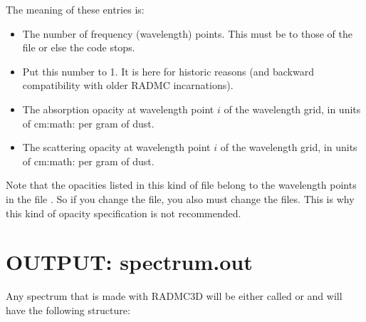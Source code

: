 \documentclass[letterpaper,10pt,english]{sphinxmanual}
\begin{document}
\begin{sphinxVerbatim}[commandchars=\\\{\}]
   
\PYG{p}{[}\PYG{p}{]}
\PYG{p}{[}\PYG{p}{]}
\PYG{p}{[}\PYG{p}{]}
\PYG{p}{[}\PYG{p}{]}
\end{sphinxVerbatim}

The meaning of these entries is:
\begin{itemize}
\item {} 
 The number of frequency (wavelength) points. This
must be  to those of the  file
or else the code stops.

\item {} 
 Put this number to 1. It is here for historic
reasons (and backward compatibility with older RADMC incarnations).

\item {} 
 The absorption opacity at wavelength point
\(i\) of the  wavelength grid, in units of
cm:math: per gram of dust.

\item {} 
 The scattering opacity at wavelength point
\(i\) of the  wavelength grid, in units of
cm:math: per gram of dust. 

\end{itemize}

Note that the opacities listed in this kind of file belong to the wavelength
points in the file . So if you change the
 file, you also must change the
 files. This is why this kind of opacity
specification is not recommended.


\section{OUTPUT: spectrum.out}
\label{\detokenize{inputoutputfiles:output-spectrum-out}}\label{\detokenize{inputoutputfiles:sec-output-spectrum-out}}
Any spectrum that is made with RADMC\sphinxhyphen{}3D will be either called
 or  and will have
the following structure:
\end{document}
